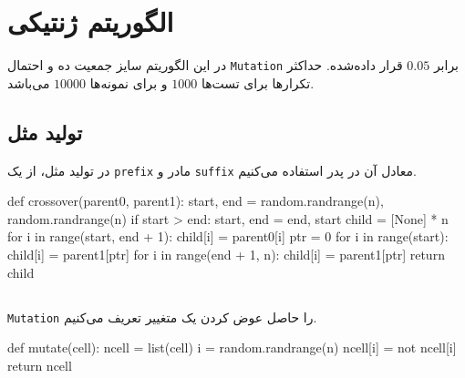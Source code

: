 \section{الگوریتم ژنتیکی}
در این الگوریتم سایز جمعیت ده و احتمال
\verb;Mutation;
برابر
$0.05$
قرار داده‌شده.
حداکثر تکرارها برای تست‌ها 
$1000$
و برای نمونه‌ها
$10000$
می‌باشد.


\subsection{تولید مثل}
در تولید مثل، از یک
\verb;prefix;
مادر و 
\verb;suffix;
معادل آن در پدر استفاده می‌کنیم.

\begin{latin}
\begin{python}
    def crossover(parent0, parent1):
        start, end = random.randrange(n), random.randrange(n)
        if start > end:
            start, end = end, start
        child = [None] * n
        for i in range(start, end + 1):
            child[i] = parent0[i]
        ptr = 0
        for i in range(start):
            child[i] = parent1[ptr]
        for i in range(end + 1, n):
            child[i] = parent1[ptr]
        return child


\end{python}
\end{latin}

\subsection{}
\verb;Mutation;
را حاصل عوض کردن یک متغییر تعریف می‌کنیم.

\begin{latin}
\begin{python}
    def mutate(cell):
        ncell = list(cell)
        i = random.randrange(n)
        ncell[i] = not ncell[i]
        return ncell


\end{python}
\end{latin}


